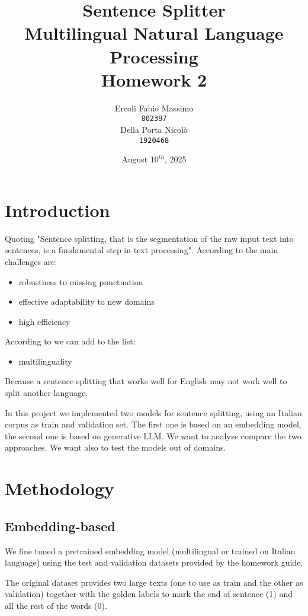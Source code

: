 \documentclass[11pt]{article}
\title{%
	Sentence Splitter\\
	\large Multilingual Natural Language Processing \\
	Homework 2}
\date{August $10^{th}$, 2025}
\author{Ercoli Fabio Massimo \\
\texttt{802397} \\\And
Della Porta Nicolò \\
\texttt{1920468} \\}
\begin{document}
\maketitle

\section{Introduction}

Quoting \cite{redaelli-sprugnoli-2024-sentence} "Sentence splitting, that is the segmentation of the raw input text into sentences, is a fundamental step in text processing".  According to \cite{frohmann2024segmenttextuniversalapproach} the main challenges are:

\begin{itemize}
	\item robustness to missing punctuation
	\item effective adaptability to new domains
	\item high efficiency
\end{itemize}

According to \cite{redaelli-sprugnoli-2024-sentence} we can add to the list:

\begin{itemize}
	\item multilinguality
\end{itemize}

Because a sentence splitting that works well for English may not work well to split another language.

In this project we implemented two models for sentence splitting, using an Italian corpus as train and validation set.
The first one is based on an embedding model, the second one is based on generative LLM.
We want to analyze compare the two approaches. 
We want also to test the models out of domains.

\section{Methodology}

\subsection{Embedding-based}

We fine tuned a pretrained embedding model (multilingual or trained on Italian language) using the test and validation datasets provided by the homework guide.

The original dataset provides two large texts (one to use as train and the other as validation) together with the golden labels to mark the end of sentence (1) and all the rest of the words (0).
\end{document}
